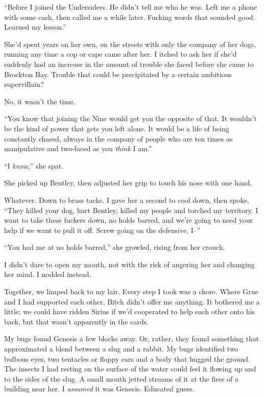 ``Before I joined the Undersiders.  He didn't tell me who he was.  Left me a phone with some cash, then called me a while later.  Fucking words that sounded good.  Learned my lesson.''



She'd spent years on her own, on the streets with only the company of her dogs, running any time a cop or cape came after her.  I itched to ask her if she'd suddenly had an increase in the amount of trouble she faced before she came to Brockton Bay.  Trouble that could be precipitated by a certain ambitious supervillain?



No, it wasn't the time.



``You know that joining the Nine would get you the opposite of that.  It wouldn't be the kind of power that gets you left alone.  It would be a life of being constantly chased, always in the company of people who are ten times as manipulative and two-faced as you \emph{think} I am.''



``I \emph{know},'' she spat.



She picked up Bentley, then adjusted her grip to touch his nose with one hand.



Whatever.  Down to brass tacks.  I gave her a second to cool down, then spoke, ``They killed your dog, hurt Bentley, killed my people and torched my territory.  I want to take these fuckers down, no holds barred, and we're going to need your help if we want to pull it off.  Screw going on the defensive, I--''



``You had me at no holds barred,'' she growled, rising from her crouch.



I didn't dare to open my mouth, not with the risk of angering her and changing her mind.  I nodded instead.



Together, we limped back to my lair.  Every step I took was a chore.  Where Grue and I had supported each other, Bitch didn't offer me anything.  It bothered me a little; we could have ridden Sirius if we'd cooperated to help each other onto his back, but that wasn't apparently in the cards.



My bugs found Genesis a few blocks away.  Or, rather, they found something that approximated a blend between a slug and a rabbit.  My bugs identified two bulbous eyes, two tentacles or floppy ears and a body that hugged the ground.  The insects I had resting on the surface of the water could feel it flowing up and to the sides of the slug.  A small mouth jetted streams of it at the fires of a building near her.  I \emph{assumed} it was Genesis.  Educated guess.



